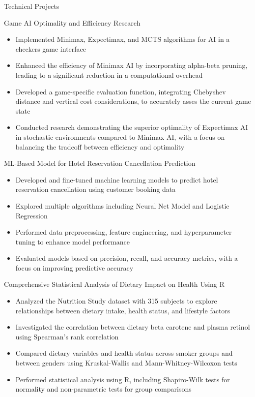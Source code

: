\documentclass[calibri]{mcdowellcv}
\begin{document}
	\begin{cvsection}{Technical Projects}
		\begin{cvsubsection2}{Game AI Optimality and Efficiency Research}
			\begin{itemize}
				\item Implemented Minimax, Expectimax, and MCTS algorithms for AI in a checkers game interface
				\item Enhanced the efficiency of Minimax AI by incorporating alpha-beta pruning, leading to a significant reduction in a computational overhead
				\item Developed a game-specific evaluation function, integrating Chebyshev distance and vertical cost considerations, to accurately asses the current game state
				\item Conducted research demonstrating the superior optimality of Expectimax AI in stochastic environments compared to Minimax AI, with a focus on balancing the tradeoff between efficiency and optimality
			\end{itemize}
		\end{cvsubsection2}

		\begin{cvsubsection2}{ML-Based Model for Hotel Reservation Cancellation Prediction}
			\begin{itemize}
				\item Developed and fine-tuned machine learning models to predict hotel reservation cancellation using customer booking data
				\item Explored multiple algorithms including Neural Net Model and Logistic Regression
				\item Performed data preprocessing, feature engineering, and hyperparameter tuning to enhance model performance
				\item Evaluated models based on precision, recall, and accuracy metrics, with a focus on improving predictive accuracy
			\end{itemize}
		\end{cvsubsection2}

		\begin{cvsubsection2}{Comprehensive Statistical Analysis of Dietary Impact on Health Using R}
			\begin{itemize}
				\item Analyzed the Nutrition Study dataset with 315 subjects to explore relationships between dietary intake, health status, and lifestyle factors
				\item Investigated the correlation between dietary beta carotene and plasma retinol using Spearman's rank correlation
				\item Compared dietary variables and health status across smoker groups and between genders using Kruskal-Wallis and Mann-Whitney-Wilcoxon tests
				\item Performed statistical analysis using R, including Shapiro-Wilk tests for normality and non-parametric tests for group comparisons
			\end{itemize}
		\end{cvsubsection2}
	\end{cvsection}
	
\end{document}
